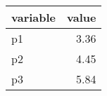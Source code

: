 \begin{tabular}{lr}
  \hline
variable & value \\ 
  \hline
p1 & 3.36 \\ 
  p2 & 4.45 \\ 
  p3 & 5.84 \\ 
   \hline
\end{tabular}
